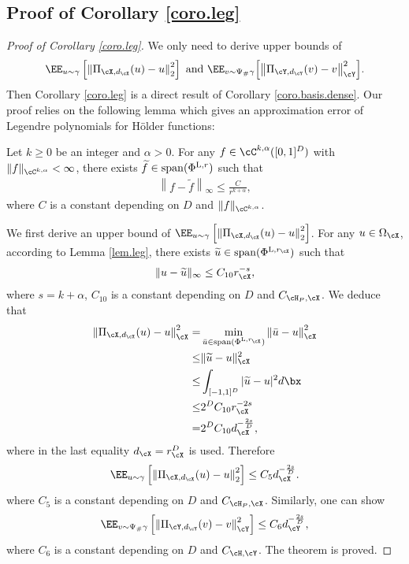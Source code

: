 \documentclass[11pt]{article} %
\newcommand{\spspan}{\mathrm{span}}
\begin{document}
\subsection{Proof of Corollary \ref{coro.leg}}
\label{coro.leg.proof}
\begin{proof}[Proof of Corollary \ref{coro.leg}]
	We only need to derive upper bounds of 
	$$
	\EE_{u\sim \gamma}\left[ \left\| \Pi_{\cX,d_{\cX}}(u)-u\right\|_{2}^2\right] \mbox{ and } \EE_{v\sim \Psi_{\#}\gamma}\Big[ \big\|\Pi_{\cY,d_{\cY}}(v)- v\big\|_{\cY}^2\Big].
	$$ Then Corollary \ref{coro.leg} is a direct result of Corollary \ref{coro.basis.dense}.
	Our proof relies on the following lemma which gives an approximation error of Legendre polynomials for H\"{o}lder functions:
	\begin{lemma}\label{lem.leg}
		Let $k\geq0$ be an integer and $\alpha>0$. For any $f\in \cC^{k,\alpha}([0,1]^D)$ with $\|f\|_{\cC^{k,\alpha}}<\infty$, there exists $\widetilde{f}\in \spspan(\Phi^{{\rm L},r})$ such that
		\begin{align}
			\left\|f-\widetilde{f}\right\|_{\infty}\leq \frac{C}{r^{k+\alpha}},
		\end{align}
		where $C$ is a constant depending on $D$ and $\|f\|_{\cC^{k,\alpha}}$.
	\end{lemma}
	We first derive an upper bound of $\EE_{u\sim \gamma}\left[\left\| \Pi_{\cX,d_{\cX}}(u)-u\right\|_{2}^2\right]$. For any $u\in \Omega_{\cX}$, according to Lemma \ref{lem.leg}, there exists $\widetilde{u}\in \spspan(\Phi^{{\rm L},r_{\cX}})$ such that
	$$
	\|u-\widetilde{u}\|_{\infty}\leq C_{10}r_{\cX}^{-s},
	$$
	where $s=k+\alpha$, $C_{10}$ is a constant depending on $D$ and $C_{\cH_P,\cX}$. We deduce that
	\begin{align*}
		\left\| \Pi_{\cX,d_{\cX}}(u)-u\right\|_{\cX}^2=&\min_{\bar{u}\in \spspan(\Phi^{{\rm L},r_{\cX}})} \left\|\bar{u}-u\right\|_{\cX}^2\\
		\leq & \|\widetilde{u}-u\|_{\cX}^2\\
		\leq & \int_{[-1,1]^D} |\widetilde{u}-u|^2d\bx\\
		\leq & 2^DC_{10}r_{\cX}^{-2s}\\
		=&2^DC_{10}d_{\cX}^{-\frac{2s}{D}},
	\end{align*}
	where in the last equality $d_{\cX}=r_{\cX}^D$ is used. Therefore
	\begin{align*}
		\EE_{u\sim \gamma}\left[\left\| \Pi_{\cX,d_{\cX}}(u)-u\right\|_{2}^2\right]\leq C_5d_{\cX}^{-\frac{2s}{D}}.
	\end{align*}
where $C_5$ is a constant depending on $D$ and $C_{\cH_P,\cX}$.
	Similarly, one can show
	\begin{align*}
		\EE_{v\sim \Psi_{\#}\gamma}\left[ \left\|\Pi_{\cY,d_{\cY}}(v)- v\right\|_{\cY}^2\right]\leq C_6d_{\cY}^{-\frac{2s}{D}},
	\end{align*}
	where $C_6$ is a constant depending on $D$ and $C_{\cH,\cY}$.
	The theorem is proved.
\end{proof}
\end{document}
